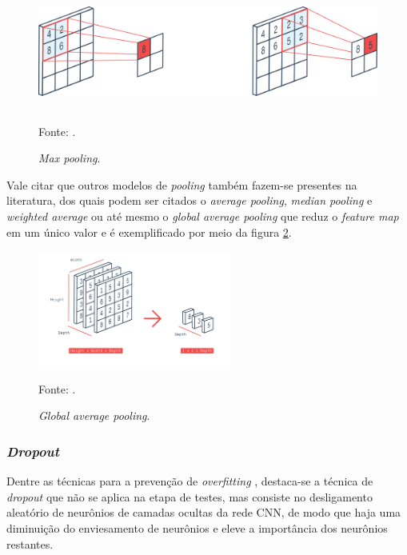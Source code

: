 \begin{figure}[H]
    \centering
    \caption{\textit{Max pooling}.}
    \includegraphics[height=1.5in]{recursos/imagens/deep/max_pooling.png}
    \label{deep:fig:7}
    
    \vspace*{1 cm}
    Fonte: \cite{PeltarionAI}.
\end{figure}

Vale citar que outros modelos de \textit{pooling} também fazem-se presentes na literatura, dos quais podem ser citados o \textit{average pooling}, \textit{median pooling} e \textit{weighted average}\cite{Goodfellow2016} ou até mesmo o \textit{global average pooling} que reduz o \textit{feature map} em um único valor e é exemplificado por meio da figura \ref{deep:fig:8}.

\begin{figure}[H]
    \centering
    \caption{\textit{Global average pooling}.}
    \includegraphics[height=1.5in]{recursos/imagens/deep/global_average_pooling.png}
    \label{deep:fig:8}
    
    \vspace*{1 cm}
    Fonte: \cite{PeltarionAI}.
\end{figure}

\subsubsection{\textit{Dropout}}
\label{deep:dropout}

Dentre as técnicas para a prevenção de \textit{overfitting} \cite{Goodfellow2016}, destaca-se a técnica de \textit{dropout} que não se aplica na etapa de testes, mas consiste no desligamento aleatório de neurônios de camadas ocultas da rede CNN, de modo que haja uma diminuição do enviesamento de neurônios e eleve a importância dos neurônios restantes.

